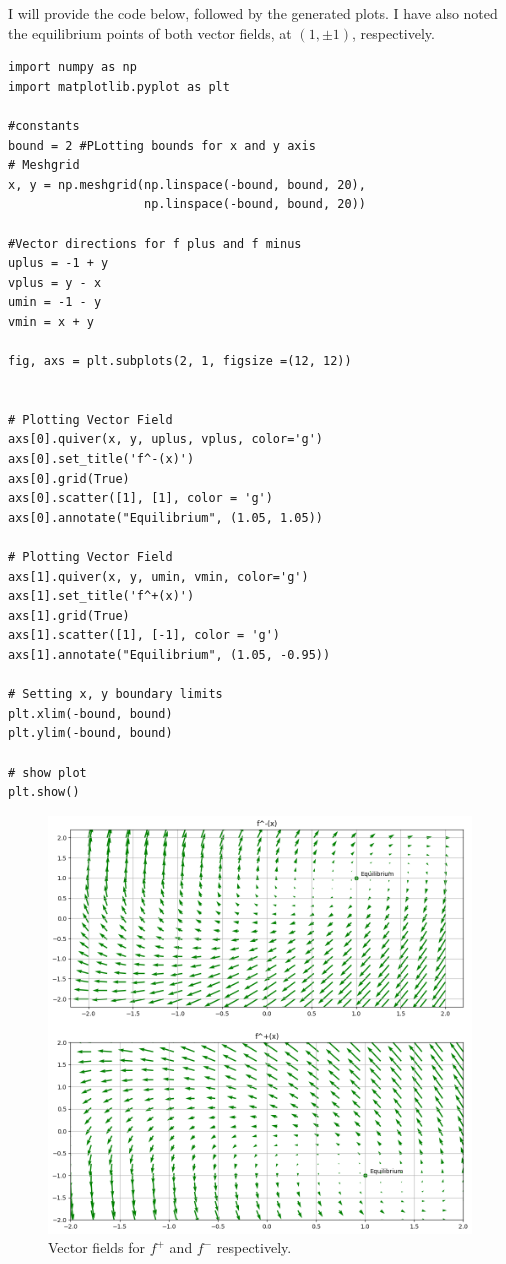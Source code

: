\begin{solution}
    I will provide the code below, followed by the generated plots. I have also noted the equilibrium points of both vector fields, at $(1, \pm1)$, respectively. 
\partbreak
\begin{lstlisting}
import numpy as np 
import matplotlib.pyplot as plt 

#constants
bound = 2 #PLotting bounds for x and y axis
# Meshgrid 
x, y = np.meshgrid(np.linspace(-bound, bound, 20),  
                   np.linspace(-bound, bound, 20)) 

#Vector directions for f plus and f minus
uplus = -1 + y
vplus = y - x
umin = -1 - y
vmin = x + y

fig, axs = plt.subplots(2, 1, figsize =(12, 12))


# Plotting Vector Field  
axs[0].quiver(x, y, uplus, vplus, color='g') 
axs[0].set_title('f^-(x)') 
axs[0].grid(True)
axs[0].scatter([1], [1], color = 'g')
axs[0].annotate("Equilibrium", (1.05, 1.05))

# Plotting Vector Field  
axs[1].quiver(x, y, umin, vmin, color='g') 
axs[1].set_title('f^+(x)') 
axs[1].grid(True)
axs[1].scatter([1], [-1], color = 'g')
axs[1].annotate("Equilibrium", (1.05, -0.95))

# Setting x, y boundary limits 
plt.xlim(-bound, bound) 
plt.ylim(-bound, bound) 
  
# show plot
plt.show() 
\end{lstlisting}

\jump
\begin{figure}[!ht]
\centering
\includegraphics[scale = 0.6]{Images/individual vector fields.png}
\caption{Vector fields for $f^+$ and $f^-$ respectively.}
\label{png:individual vector fields}
\end{figure}
\end{solution}

